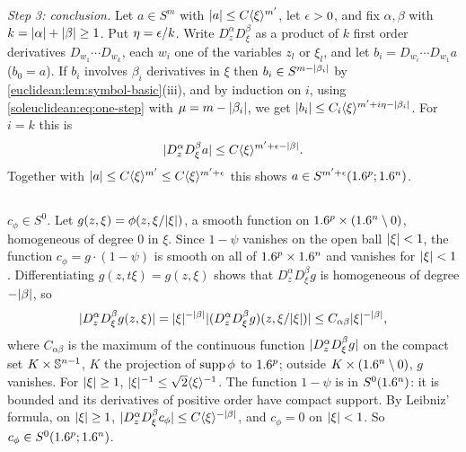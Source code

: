 \emph{Step 3: conclusion.} Let $a\in S^m$ with $\lvert a\rvert\le C\langle \xi\rangle^{m'}$, let $\epsilon>0$,
and fix $\alpha,\beta$ with $k=\lvert \alpha\rvert+\lvert \beta\rvert\ge1$. Put $\eta=\epsilon/k$. Write
$D^\alpha_zD^\beta_\xi$ as a product of $k$ first order derivatives
$D_{w_1}\cdots D_{w_k}$, each $w_i$ one of the variables $z_l$ or $\xi_l$, and let
$b_i=D_{w_i}\cdots D_{w_1}a$ ($b_0=a$). If $b_{i}$ involves $\beta_i$ derivatives in $\xi$
then $b_{i}\in S^{m-\lvert \beta_i\rvert}$ by \cref{euclidean:lem:symbol-basic}(iii), and by
induction on $i$, using \eqref{soleuclidean:eq:one-step} with
$\mu=m-\lvert \beta_{i}\rvert$, we get
$\lvert b_i\rvert\le C_i\langle \xi\rangle^{m'+i\eta-\lvert \beta_i\rvert}$. For $i=k$ this is
\begin{equation*}
  \lvert D^\alpha_zD^\beta_\xi a\rvert\le C\langle \xi\rangle^{m'+\epsilon-\lvert \beta\rvert}.
\end{equation*}
Together with $\lvert a\rvert\le C\langle \xi\rangle^{m'}\le C\langle \xi\rangle^{m'+\epsilon}$ this shows
$a\in S^{m'+\epsilon}(1.6^p;1.6^n)$.

\subsection*{}

\emph{$c_\phi\in S^0$.} Let $g(z,\xi)=\phi(z,\xi/\lvert \xi\rvert)$, a smooth function on
$1.6^p\times(1.6^n\setminus0)$, homogeneous of degree $0$ in $\xi$. Since $1-\psi$
vanishes on the open ball $\lvert \xi\rvert<1$, the function $c_\phi=g\cdot(1-\psi)$ is smooth on
all of $1.6^p\times1.6^n$ and vanishes for $\lvert \xi\rvert<1$. Differentiating
$g(z,t\xi)=g(z,\xi)$ shows that $D^\alpha_zD^\beta_\xi g$ is homogeneous of degree
$-\lvert \beta\rvert$, so
\begin{equation*}
  \lvert D^\alpha_zD^\beta_\xi g(z,\xi)\rvert=\lvert \xi\rvert^{-\lvert \beta\rvert}
  \lvert (D^\alpha_zD^\beta_\xi g)(z,\xi/\lvert \xi\rvert)\rvert\le C_{\alpha\beta}\lvert \xi\rvert^{-\lvert \beta\rvert},
\end{equation*}
where $C_{\alpha\beta}$ is the maximum of the continuous function
$\lvert D^\alpha_zD^\beta_\xi g\rvert$ on the compact set $K\times\mathbb{S}^{n-1}$, $K$ the
projection of $\operatorname{supp}\phi$ to $1.6^p$; outside $K\times(1.6^n\setminus0)$, $g$ vanishes. For
$\lvert \xi\rvert\ge1$, $\lvert \xi\rvert^{-1}\le\sqrt2\langle \xi\rangle^{-1}$. The function $1-\psi$ is in
$S^0(1.6^n)$: it is bounded and its derivatives of positive order have compact support.
By Leibniz' formula, on $\lvert \xi\rvert\ge1$,
$\lvert D^\alpha_zD^\beta_\xi c_\phi\rvert\le C\langle \xi\rangle^{-\lvert \beta\rvert}$, and $c_\phi=0$ on
$\lvert \xi\rvert<1$. So $c_\phi\in S^0(1.6^p;1.6^n)$.

